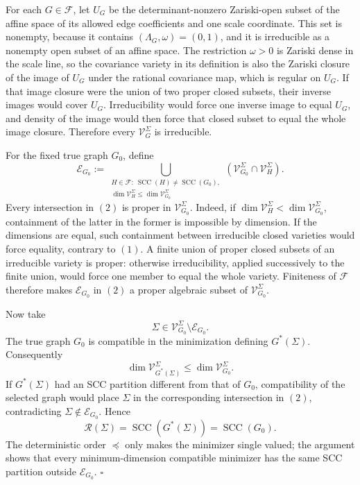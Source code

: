 For each \(G\in\mathcal F\), let \(U_G\) be the determinant-nonzero Zariski-open subset of the affine space of its allowed edge coefficients and one scale coordinate.  This set is nonempty, because it contains \((\Lambda_G,\omega)=(0,1)\), and it is irreducible as a nonempty open subset of an affine space.  The restriction \(\omega>0\) is Zariski dense in the scale line, so the covariance variety in its definition is also the Zariski closure of the image of \(U_G\) under the rational covariance map, which is regular on \(U_G\).  If that image closure were the union of two proper closed subsets, their inverse images would cover \(U_G\).  Irreducibility would force one inverse image to equal \(U_G\), and density of the image would then force that closed subset to equal the whole image closure.  Therefore every \(\mathcal V_G^\Sigma\) is irreducible.

For the fixed true graph \(G_0\), define
\[
 \mathcal E_{G_0}
 :=\bigcup_{\substack{H\in\mathcal F:\
       \operatorname{SCC}(H)\ne\operatorname{SCC}(G_0),\\
       \dim\mathcal V_H^\Sigma\le\dim\mathcal V_{G_0}^\Sigma}}
 \left(\mathcal V_{G_0}^\Sigma\cap\mathcal V_H^\Sigma\right).
 \tag{2}
\]
Every intersection in \((2)\) is proper in \(\mathcal V_{G_0}^\Sigma\).  Indeed, if
\(\dim\mathcal V_H^\Sigma<\dim\mathcal V_{G_0}^\Sigma\), containment of the latter in the former is impossible by dimension.  If the dimensions are equal, such containment between irreducible closed varieties would force equality, contrary to \((1)\).  A finite union of proper closed subsets of an irreducible variety is proper: otherwise irreducibility, applied successively to the finite union, would force one member to equal the whole variety.  Finiteness of \(\mathcal F\) therefore makes \(\mathcal E_{G_0}\) in \((2)\) a proper algebraic subset of \(\mathcal V_{G_0}^\Sigma\).

Now take
\[
 \Sigma\in\mathcal V_{G_0}^\Sigma\setminus\mathcal E_{G_0}.
\]
The true graph \(G_0\) is compatible in the minimization defining \(G^*(\Sigma)\).  Consequently
\[
 \dim\mathcal V_{G^*(\Sigma)}^\Sigma
 \le\dim\mathcal V_{G_0}^\Sigma.
\]
If \(G^*(\Sigma)\) had an SCC partition different from that of \(G_0\), compatibility of the selected graph would place \(\Sigma\) in the corresponding intersection in \((2)\), contradicting \(\Sigma\notin\mathcal E_{G_0}\).  Hence
\[
 \mathcal R(\Sigma)=\operatorname{SCC}(G^*(\Sigma))
 =\operatorname{SCC}(G_0).
\]
The deterministic order \(\preceq\) only makes the minimizer single valued; the argument shows that every minimum-dimension compatible minimizer has the same SCC partition outside \(\mathcal E_{G_0}\). \(\square\)

